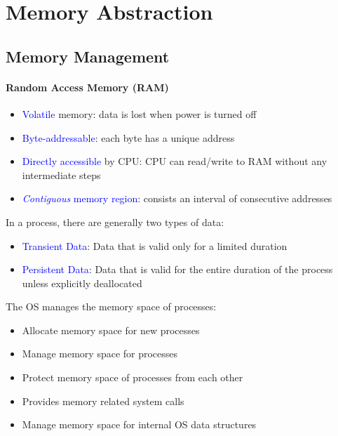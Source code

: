 \section{Memory Abstraction}
\subsection{Memory Management}
\paragraph{Random Access Memory (RAM)}
\begin{itemize}
  \item \textcolor{Blue}{Volatile} memory: data is lost when power is turned off
  \item \textcolor{Blue}{Byte-addressable}: each byte has a unique address
  \item \textcolor{Blue}{Directly accessible} by CPU: CPU can read/write to RAM without
    any intermediate steps
\item \textcolor{Blue}{\emph{Contiguous} memory region}: consists an
    interval of \textcolor{Bittersweet}{consecutive} addresses
\end{itemize}
In a process, there are generally two types of data:
\begin{itemize}
  \item \textcolor{Blue}{Transient Data}: Data that is valid only for a limited duration
  \item \textcolor{Blue}{Persistent Data}: Data that is valid for the entire
    duration of the process unless explicitly deallocated
\end{itemize}
The OS \textcolor{Bittersweet}{manages the memory space} of processes:
\begin{itemize}
  \item Allocate memory space for new processes
  \item Manage memory space for processes
  \item Protect memory space of processes from each other
  \item Provides memory related system calls
  \item Manage memory space for internal OS data structures
\end{itemize}

